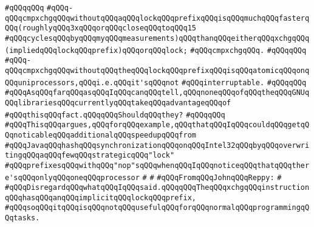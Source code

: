 \verb|#qQQqqQQq|\newline
\verb|#qQQq-qQQqcmpxchgqQQqwithoutqQQqaqQQqlockqQQqprefixqQQqisqQQqmuchqQQqfasterqQQq(roughlyqQQq3xqQQqorqQQqcloseqQQqtoqQQq15|\newline
\verb|#qQQqcyclesqQQqbyqQQqmyqQQqmeasurements)qQQqthanqQQqeitherqQQqxchgqQQq(impliedqQQqlockqQQqprefix)qQQqorqQQqlock;|\newline
\verb|#qQQqcmpxchgqQQq.|\newline
\verb|#qQQqqQQq|\newline
\verb|#qQQq-qQQqcmpxchgqQQqwithoutqQQqtheqQQqlockqQQqprefixqQQqisqQQqatomicqQQqonqQQquniprocessors,qQQqi.e.qQQqit'sqQQqnot|\newline
\verb|#qQQqinterruptable.|\newline
\verb|#qQQqqQQq|\newline
\verb|#qQQqAsqQQqfarqQQqasqQQqIqQQqcanqQQqtell,qQQqnoneqQQqofqQQqtheqQQqGNUqQQqlibrariesqQQqcurrentlyqQQqtakeqQQqadvantageqQQqof|\newline
\verb|#qQQqthisqQQqfact.qQQqqQQqShouldqQQqthey?|\newline
\verb|#qQQqqQQq|\newline
\verb|#qQQqThisqQQqargues,qQQqforqQQqexample,qQQqthatqQQqIqQQqcouldqQQqgetqQQqnoticableqQQqadditionalqQQqspeedupqQQqfrom|\newline
\verb|#qQQqJavaqQQqhashqQQqsynchronizationqQQqonqQQqIntel32qQQqbyqQQqoverwritingqQQqaqQQqfewqQQqstrategicqQQq"lock"|\newline
\verb|#qQQqprefixesqQQqwithqQQq"nop"sqQQqwhenqQQqIqQQqnoticeqQQqthatqQQqthere'sqQQqonlyqQQqoneqQQqprocessor|\newline
\verb|#|\newline
\verb|#|\newline
\verb|#qQQqFromqQQqJohnqQQqReppy:|\newline
\verb|#|\newline
\verb|#qQQqDisregardqQQqwhatqQQqIqQQqsaid.qQQqqQQqTheqQQqxchgqQQqinstructionqQQqhasqQQqanqQQqimplicitqQQqlockqQQqprefix,|\newline
\verb|#qQQqsoqQQqitqQQqisqQQqnotqQQqusefulqQQqforqQQqnormalqQQqprogrammingqQQqtasks.|\newline

